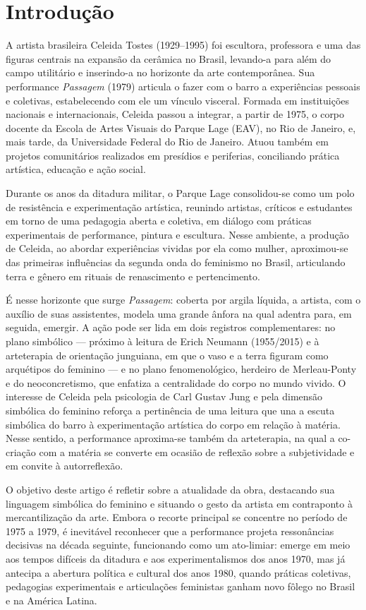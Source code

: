 \section*{Introdução}
A artista brasileira Celeida Tostes (1929–1995) foi escultora, professora e uma das figuras centrais na expansão da cerâmica no Brasil, levando-a para além do campo utilitário e inserindo-a no horizonte da arte contemporânea. Sua performance \emph{Passagem} (1979) articula o fazer com o barro a experiências pessoais e coletivas, estabelecendo com ele um vínculo visceral. Formada em instituições nacionais e internacionais, Celeida passou a integrar, a partir de 1975, o corpo docente da Escola de Artes Visuais do Parque Lage (EAV), no Rio de Janeiro, e, mais tarde, da Universidade Federal do Rio de Janeiro. Atuou também em projetos comunitários realizados em presídios e periferias, conciliando prática artística, educação e ação social.

Durante os anos da ditadura militar, o Parque Lage consolidou-se como um polo de resistência e experimentação artística, reunindo artistas, críticos e estudantes em torno de uma pedagogia aberta e coletiva, em diálogo com práticas experimentais de performance, pintura e escultura. Nesse ambiente, a produção de Celeida, ao abordar experiências vividas por ela como mulher, aproximou-se das primeiras influências da segunda onda do feminismo no Brasil, articulando terra e gênero em rituais de renascimento e pertencimento.

É nesse horizonte que surge \emph{Passagem}: coberta por argila líquida, a artista, com o auxílio de suas assistentes, modela uma grande ânfora na qual adentra para, em seguida, emergir. A ação pode ser lida em dois registros complementares: no plano simbólico — próximo à leitura de Erich Neumann (1955/2015) e à arteterapia de orientação junguiana, em que o vaso e a terra figuram como arquétipos do feminino — e no plano fenomenológico, herdeiro de Merleau-Ponty e do neoconcretismo, que enfatiza a centralidade do corpo no mundo vivido. O interesse de Celeida pela psicologia de Carl Gustav Jung e pela dimensão simbólica do feminino reforça a pertinência de uma leitura que una a escuta simbólica do barro à experimentação artística do corpo em relação à matéria. Nesse sentido, a performance aproxima-se também da arteterapia, na qual a co-criação com a matéria se converte em ocasião de reflexão sobre a subjetividade e em convite à autorreflexão.

O objetivo deste artigo é refletir sobre a atualidade da obra, destacando sua linguagem simbólica do feminino e situando o gesto da artista em contraponto à mercantilização da arte. Embora o recorte principal se concentre no período de 1975 a 1979, é inevitável reconhecer que a performance projeta ressonâncias decisivas na década seguinte, funcionando como um ato-limiar: emerge em meio aos tempos difíceis da ditadura e aos experimentalismos dos anos 1970, mas já antecipa a abertura política e cultural dos anos 1980, quando práticas coletivas, pedagogias experimentais e articulações feministas ganham novo fôlego no Brasil e na América Latina.

